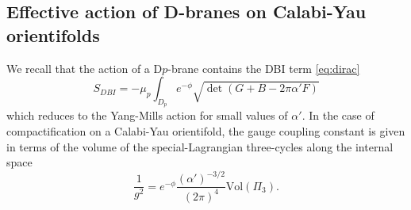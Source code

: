 \subsection{Effective action of D-branes on Calabi-Yau orientifolds}


We recall that the action of a D$p$-brane contains the DBI term \eqref{eq:dirac}
\begin{equation}
  S_{DBI} = -\mu_p \int_{D_p} e^{-\phi}\sqrt{\det (G+B-2\pi \alpha' F)}
\end{equation}
which reduces to the Yang-Mills action for small values of $\alpha'$.
In the case of compactification on a Calabi-Yau orientifold, the gauge coupling  constant is given
in terms of the volume of the special-Lagrangian three-cycles along the internal space
\begin{equation}
  \frac{1}{g^2}=e^{-\phi}\frac{(\alpha')^{-3/2}}{(2\pi)^{4}}\mathrm{Vol}(\Pi_{3}).
\end{equation}

%

